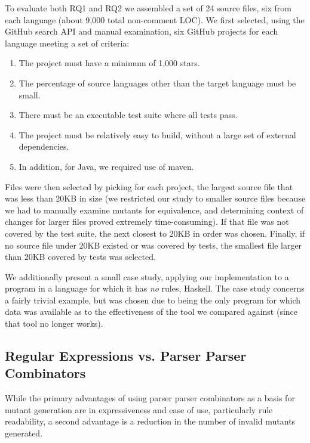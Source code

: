 \documentclass[acmsmall,screen,review,anonymous]{acmart}
\begin{document}
{To evaluate both RQ1 and RQ2 we assembled a set of 24 source files,
six from each language (about 9,000 total non-comment LOC).  We first selected, using the GitHub search
API and manual examination, six GitHub
projects for each language meeting a set of criteria:

\begin{enumerate}
\item The project must have a minimum of 1,000 stars.
  \item The percentage of source languages other than the target
    language must be small.
  \item There must be an executable test suite where all tests pass.
    \item The project must be relatively easy to build, without a
      large set of external dependencies.
      \item In addition, for Java, we required use of maven.
      \end{enumerate}

      Files were then selected by picking for each project, the
      largest source file that was less than 20KB in size (we
      restricted our study to smaller source files because we had to
      manually examine mutants for equivalence, and determining
      context of changes for larger files proved extremely time-consuming).  If that
      file was not covered by the test suite, the next closest to 20KB in order
      was chosen.  Finally, if no source file under 20KB existed or
      was covered by tests, the smallest file larger than 20KB covered
      by tests was selected.


We additionally present a small
case study, applying our implementation to a program in a language for
which it has \emph{no} rules, Haskell.  The case study concerns a
fairly trivial example, but was chosen due to being the only program
for which data was available as to the effectiveness of the tool we
compared against (since that tool no longer works).

\subsection{Regular Expressions vs. Parser Parser Combinators}

While the primary advantages of using parser parser combinators as a
basis for mutant generation are in expressiveness and ease of use,
particularly rule readability, a second advantage is a reduction in
the number of invalid mutants generated.

}
\end{document}
